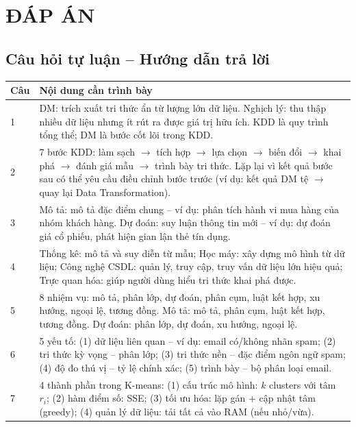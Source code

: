 \documentclass[10pt]{article}
\begin{document}
\newpage
\section*{ĐÁP ÁN}

\subsection*{Câu hỏi tự luận -- Hướng dẫn trả lời}

\begin{singlespace}
\begin{longtable}{|p{}|p{}|}
\hline
\textbf{Câu} & \textbf{Nội dung cần trình bày} \\
\hline
\endhead
1 & DM: trích xuất tri thức ẩn từ lượng lớn dữ liệu. Nghịch lý: thu thập nhiều dữ liệu nhưng ít rút ra được giá trị hữu ích. KDD là quy trình tổng thể; DM là bước cốt lõi trong KDD. \\
\hline
2 & 7 bước KDD: làm sạch $\to$ tích hợp $\to$ lựa chọn $\to$ biến đổi $\to$ khai phá $\to$ đánh giá mẫu $\to$ trình bày tri thức. Lặp lại vì kết quả bước sau có thể yêu cầu điều chỉnh bước trước (ví dụ: kết quả DM tệ $\to$ quay lại Data Transformation). \\
\hline
3 & Mô tả: mô tả đặc điểm chung -- ví dụ: phân tích hành vi mua hàng của nhóm khách hàng. Dự đoán: suy luận thông tin mới -- ví dụ: dự đoán giá cổ phiếu, phát hiện gian lận thẻ tín dụng. \\
\hline
4 & Thống kê: mô tả và suy diễn từ mẫu; Học máy: xây dựng mô hình từ dữ liệu; Công nghệ CSDL: quản lý, truy cập, truy vấn dữ liệu lớn hiệu quả; Trực quan hóa: giúp người dùng hiểu tri thức khai phá được. \\
\hline
5 & 8 nhiệm vụ: mô tả, phân lớp, dự đoán, phân cụm, luật kết hợp, xu hướng, ngoại lệ, tương đồng. Mô tả: mô tả, phân cụm, luật kết hợp, tương đồng. Dự đoán: phân lớp, dự đoán, xu hướng, ngoại lệ. \\
\hline
6 & 5 yếu tố: (1) dữ liệu liên quan -- ví dụ: email có/không nhãn spam; (2) tri thức kỳ vọng -- phân lớp; (3) tri thức nền -- đặc điểm ngôn ngữ spam; (4) độ đo thú vị -- tỷ lệ chính xác; (5) trình bày -- bộ phân loại email. \\
\hline
7 & 4 thành phần trong K-means: (1) cấu trúc mô hình: $k$ clusters với tâm $r_i$; (2) hàm điểm số: SSE; (3) tối ưu hóa: lặp gán + cập nhật tâm (greedy); (4) quản lý dữ liệu: tải tất cả vào RAM (nếu nhỏ/vừa). \\

\end{longtable}
\end{singlespace}
\end{document}
